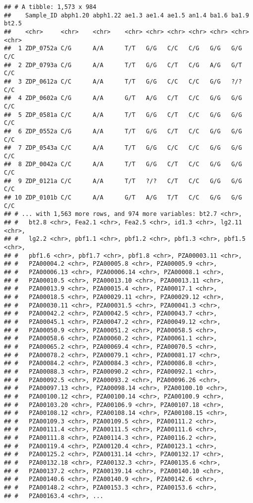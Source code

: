 \documentclass[]{article}
\begin{document}
\begin{verbatim}
## # A tibble: 1,573 x 984
##    Sample_ID abph1.20 abph1.22 ae1.3 ae1.4 ae1.5 an1.4 ba1.6 ba1.9 bt2.5
##    <chr>     <chr>    <chr>    <chr> <chr> <chr> <chr> <chr> <chr> <chr>
##  1 ZDP_0752a C/G      A/A      T/T   G/G   C/C   C/G   G/G   G/G   C/C  
##  2 ZDP_0793a C/G      A/A      T/T   G/G   C/T   C/G   A/G   G/T   C/C  
##  3 ZDP_0612a C/C      A/A      T/T   G/G   C/C   C/C   G/G   ?/?   C/C  
##  4 ZDP_0602a C/G      A/A      G/T   A/G   C/T   C/C   G/G   G/G   C/C  
##  5 ZDP_0581a C/C      A/A      T/T   G/G   C/T   C/C   G/G   G/G   C/C  
##  6 ZDP_0552a C/G      A/A      T/T   G/G   C/T   C/C   G/G   G/G   C/C  
##  7 ZDP_0543a C/C      A/A      T/T   G/G   C/C   C/C   G/G   G/G   C/C  
##  8 ZDP_0042a C/C      A/A      T/T   G/G   C/T   C/C   G/G   G/G   C/C  
##  9 ZDP_0121a C/C      A/A      T/T   ?/?   C/T   C/C   G/G   G/G   C/C  
## 10 ZDP_0101b C/C      A/A      G/T   A/G   T/T   C/C   G/G   G/G   C/C  
## # ... with 1,563 more rows, and 974 more variables: bt2.7 <chr>,
## #   bt2.8 <chr>, Fea2.1 <chr>, Fea2.5 <chr>, id1.3 <chr>, lg2.11 <chr>,
## #   lg2.2 <chr>, pbf1.1 <chr>, pbf1.2 <chr>, pbf1.3 <chr>, pbf1.5 <chr>,
## #   pbf1.6 <chr>, pbf1.7 <chr>, pbf1.8 <chr>, PZA00003.11 <chr>,
## #   PZA00004.2 <chr>, PZA00005.8 <chr>, PZA00005.9 <chr>,
## #   PZA00006.13 <chr>, PZA00006.14 <chr>, PZA00008.1 <chr>,
## #   PZA00010.5 <chr>, PZA00013.10 <chr>, PZA00013.11 <chr>,
## #   PZA00013.9 <chr>, PZA00015.4 <chr>, PZA00017.1 <chr>,
## #   PZA00018.5 <chr>, PZA00029.11 <chr>, PZA00029.12 <chr>,
## #   PZA00030.11 <chr>, PZA00031.5 <chr>, PZA00041.3 <chr>,
## #   PZA00042.2 <chr>, PZA00042.5 <chr>, PZA00043.7 <chr>,
## #   PZA00045.1 <chr>, PZA00047.2 <chr>, PZA00049.12 <chr>,
## #   PZA00050.9 <chr>, PZA00051.2 <chr>, PZA00058.5 <chr>,
## #   PZA00058.6 <chr>, PZA00060.2 <chr>, PZA00061.1 <chr>,
## #   PZA00065.2 <chr>, PZA00069.4 <chr>, PZA00070.5 <chr>,
## #   PZA00078.2 <chr>, PZA00079.1 <chr>, PZA00081.17 <chr>,
## #   PZA00084.2 <chr>, PZA00084.3 <chr>, PZA00086.8 <chr>,
## #   PZA00088.3 <chr>, PZA00090.2 <chr>, PZA00092.1 <chr>,
## #   PZA00092.5 <chr>, PZA00093.2 <chr>, PZA00096.26 <chr>,
## #   PZA00097.13 <chr>, PZA00098.14 <chr>, PZA00100.10 <chr>,
## #   PZA00100.12 <chr>, PZA00100.14 <chr>, PZA00100.9 <chr>,
## #   PZA00103.20 <chr>, PZA00106.9 <chr>, PZA00107.18 <chr>,
## #   PZA00108.12 <chr>, PZA00108.14 <chr>, PZA00108.15 <chr>,
## #   PZA00109.3 <chr>, PZA00109.5 <chr>, PZA00111.2 <chr>,
## #   PZA00111.4 <chr>, PZA00111.5 <chr>, PZA00111.6 <chr>,
## #   PZA00111.8 <chr>, PZA00114.3 <chr>, PZA00116.2 <chr>,
## #   PZA00119.4 <chr>, PZA00120.4 <chr>, PZA00123.1 <chr>,
## #   PZA00125.2 <chr>, PZA00131.14 <chr>, PZA00132.17 <chr>,
## #   PZA00132.18 <chr>, PZA00132.3 <chr>, PZA00135.6 <chr>,
## #   PZA00137.2 <chr>, PZA00139.14 <chr>, PZA00140.10 <chr>,
## #   PZA00140.6 <chr>, PZA00140.9 <chr>, PZA00142.6 <chr>,
## #   PZA00148.2 <chr>, PZA00153.3 <chr>, PZA00153.6 <chr>,
## #   PZA00163.4 <chr>, ...
\end{verbatim}
\end{document}
